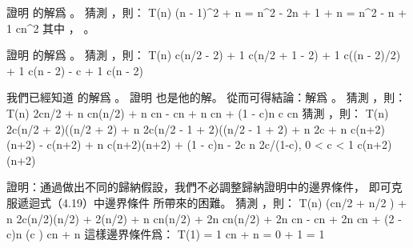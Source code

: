 \startsection[
  title={The substitution method for solving recurrences},
]

\startEXERCISE
證明  的解爲 。
\stopEXERCISE
\startANSWER
猜測 ，則：
\startformula\startalign
\NC T(n) \NC \leq (n - 1)^2 + n \NR
\NC      \NC = n^2 - 2n + 1 + n \NR
\NC      \NC = n^2 - n + 1 \NR
\NC      \NC \leq cn^2 \NR
\stopalign\stopformula
其中 ， 。
\stopANSWER

\startEXERCISE
證明  的解爲 。
\stopEXERCISE
\startANSWER
猜測 ，則：
\startformula\startalign
\NC T(n) \NC \le c\lg(\lceil n/2 \rceil - 2) + 1 \NR
\NC      \NC \le c\lg(n/2 + 1 - 2) + 1 \NR
\NC      \NC \le c\lg((n - 2)/2) + 1 \NR
\NC      \NC \le c\lg(n - 2) - c + 1 \NR
\NC      \NC \le c\lg(n - 2) \NR
\stopalign\stopformula
\stopANSWER

\startEXERCISE
我們已經知道  的解爲 。
證明  也是他的解。
從而可得結論：解爲 。
\stopEXERCISE
\startANSWER
猜測 ，則：
\startformula\startalign
\NC T(n) \NC \le 2c\lfloor n/2 \rfloor{} + n \NR
\NC      \NC \le cn\lg(n/2) + n \NR
\NC      \NC \le cn - cn + n \NR
\NC      \NC \le cn + (1 - c)n \qquad {} c  \NR
\NC      \NC \le cn \NR
\stopalign\stopformula
猜測 ，則：
\startformula\startalign
\NC T(n) \NC \ge 2c(\lfloor n/2 \rfloor + 2)(\lg(\lfloor n/2 \rfloor + 2) + n \NR
\NC      \NC \ge 2c(n/2 - 1 + 2)(\lg(n/2 - 1 + 2) + n \NR
\NC      \NC \ge 2c\lg{} + n \NR
\NC      \NC \ge c(n+2)\lg(n+2) - c(n+2) + n \NR
\NC      \NC \ge c(n+2)\lg(n+2) + (1 - c)n - 2c \qquad {} n \ge 2c/(1-c), 0 < c < 1 \NR
\NC      \NC \ge c(n+2)\lg(n+2) \NR
\stopalign\stopformula
\stopANSWER

\startEXERCISE
證明：通過做出不同的歸納假設，我們不必調整歸納證明中的邊界條件，
即可克服遞迴式（4.19）中邊界條件  所帶來的困難。
\stopEXERCISE
\startANSWER
猜測 ，則：
\startformula\startalign
\NC T(n) \NC {}(c\lfloor n/2 \rfloor{} + \lfloor n/2 \rfloor) + n \NR
\NC      \NC \le 2c(n/2)\lg(n/2) + 2(n/2) + n \NR
\NC      \NC \le cn\lg(n/2) + 2n \NR
\NC      \NC \le cn\lg(n/2) + 2n \NR
\NC      \NC \le cn - cn + 2n \NR
\NC      \NC \le cn + (2 - c)n \qquad (c )\NR
\NC      \NC \le cn + n \NR
\stopalign\stopformula
這樣邊界條件爲：
\startformula
T(1) = 1 \le cn + n = 0 + 1 = 1
\stopformula
\stopANSWER

